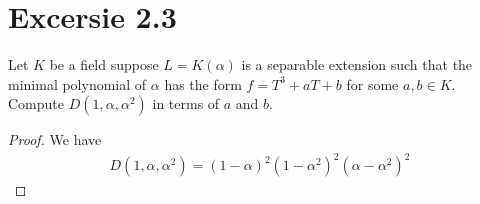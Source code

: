 \documentclass[a4paper]{article}
\begin{document}
\section*{Excersie 2.3}
Let \(K\) be a field suppose \(L = K(\alpha)\) is a separable extension such that the minimal polynomial of \(\alpha\) has the form \(f = T^3 + aT + b\) for some \(a, b \in K\). Compute \(D(1, \alpha, \alpha^2)\) in terms of \(a\) and \(b\).
\begin{proof}
  We have
  \begin{align*}
    D(1, \alpha, \alpha^2) = (1 - \alpha)^2 (1 - \alpha^2)^2 (\alpha - \alpha^2)^2
  \end{align*}
\end{proof}
\end{document}
